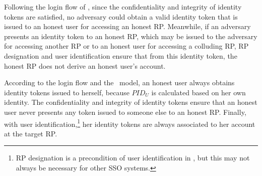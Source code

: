 
Following the login flow of \usso, since the confidentiality and integrity of identity tokens are satisfied, no adversary could obtain a valid identity token that is issued to an honest user for accessing an honest RP. %
Meanwhile, if an adversary presents an identity token to an honest RP, which may be issued to the adversary for accessing another RP or to an honest user for accessing a colluding RP, RP designation and user identification ensure that from this identity token, the honest RP does not derive an honest user's account.

According to the login flow and the \dyu\ model, an honest user always obtains identity tokens issued to herself, because $PID_U$ is calculated based on her own identity.
The confidentiality and integrity of identity tokens ensure that an honest user never presents any token issued to someone else to an honest RP. Finally, with user identification,\footnote{\newc RP designation is a precondition of user identification in \usso, but this may not always be necessary for other SSO systems.} her identity tokens are always associated to her account at the target RP.

